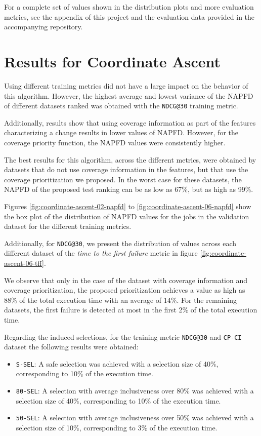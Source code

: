 For a complete set of values shown in the distribution plots and more evaluation metrics, see the appendix of this project
and the evaluation data provided in the accompanying repository.

\section{Results for Coordinate Ascent}

Using different training metrics did not have a large impact on the behavior of this algorithm. 
However, the highest average and lowest variance of the NAPFD of different datasets ranked was obtained with the 
\texttt{NDCG@30} training metric.

Additionally, results show that using coverage information as part of the features characterizing a change
results in lower values of NAPFD. However, for the coverage priority function, the NAPFD values were 
consistently higher.

The best results for this algorithm, across the different metrics, were obtained by datasets that do not
use coverage information in the features, but that use the coverage prioritization we proposed. In the worst case
for these datasets, the NAPFD of the proposed test ranking can be as low as 67\%, but as high as 99\%.

Figures \ref{fig:coordinate-ascent-02-napfd} to \ref{fig:coordinate-ascent-06-napfd} show the box plot of the distribution
of NAPFD values for the jobs in the validation dataset for the different training metrics. 

Additionally, for \texttt{NDCG@30}, we present the distribution of values 
across each different dataset of the \emph{time to the first failure} metric in figure \ref{fig:coordinate-ascent-06-tff}. 

We observe that only in the case of the dataset with coverage information and coverage prioritization, the proposed prioritization
achieves a value as high as 88\% of the total execution time with an average of 14\%. For the remaining datasets, the first failure is detected
at most in the first 2\% of the total execution time.

Regarding the induced selections, for the training metric \texttt{NDCG@30} and \texttt{CP-CI} dataset the following results were obtained:
\begin{itemize}
    \item \texttt{S-SEL}: A safe selection was achieved with a selection size of 40\%, corresponding to 10\% of the execution time.
    \item \texttt{80-SEL}: A selection with average inclusiveness over 80\% was achieved with a selection size of 40\%, corresponding to 10\% of the execution time.
    \item \texttt{50-SEL}: A selection with average inclusiveness over 50\% was achieved with a selection size of 10\%, corresponding to 3\% of the execution time.
\end{itemize}

